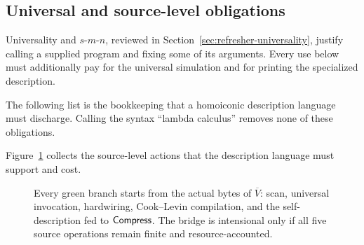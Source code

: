 \subsection{Universal and source-level obligations}

\begin{reminder}
Universality and \(s\)-\(m\)-\(n\), reviewed in
Section~\ref{sec:refresher-universality}, justify calling a supplied program
and fixing some of its arguments.  Every use below must additionally pay for
the universal simulation and for printing the specialized description.
\end{reminder}

The following list is the bookkeeping that a homoiconic description language
must discharge.  Calling the syntax ``lambda calculus'' removes none of these
obligations.

Figure~\ref{fig:source-obligations} collects the source-level actions that the
description language must support and cost.
\begin{figure}[t]
\centering

\caption{Every green branch starts from the actual bytes of \(\overline V\): scan, universal invocation, hardwiring, Cook--Levin compilation, and the self-description fed to \(\mathsf{Compress}\).  The bridge is intensional only if all five source operations remain finite and resource-accounted.}
\label{fig:source-obligations}
\end{figure}


